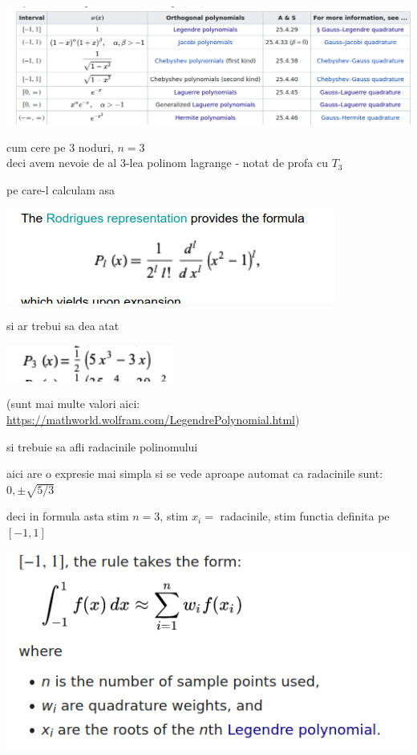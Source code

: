 \documentclass[11pt]{article}
\begin{document}
\begin{center}
\includegraphics[width=\linewidth]{./table.png}
\end{center}

cum cere pe 3 noduri, \(n = 3\)\\
deci avem nevoie de al 3-lea polinom lagrange - notat de profa cu \(T_3\)
\medskip

pe care-l calculam asa

\begin{center}
\includegraphics[width=.6\linewidth]{./rodrigues.png}
\end{center}

si ar trebui sa dea atat

\begin{center}
\includegraphics[width=.4\linewidth]{./lagrange3.png}
\end{center}

(sunt mai multe valori aici:\\
\url{https://mathworld.wolfram.com/LegendrePolynomial.html})
\medskip

si trebuie sa afli radacinile polinomului

\medskip
aici are o expresie mai simpla si se vede aproape automat ca radacinile sunt:\\
\(0, \pm \sqrt{5/3}\)

\medskip
deci in formula asta stim \(n =3\), stim \(x_i =\) radacinile, stim functia definita pe \([-1, 1]\)

\begin{center}
\includegraphics[width=.6\linewidth]{./formula.png}
\end{center}
\end{document}
